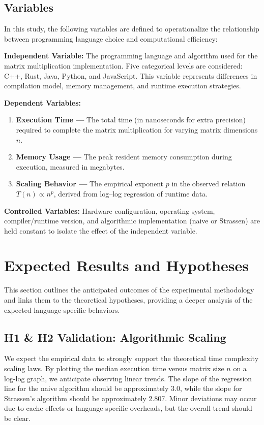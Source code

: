 \documentclass[11pt, a4paper, titlepage]{scrartcl}
\begin{document}
\subsection{Variables}

In this study, the following variables are defined to operationalize the relationship between programming language choice and computational efficiency:

\textbf{Independent Variable:}  
The programming language and algorithm used for the matrix multiplication implementation. Five categorical levels are considered: C++, Rust, Java, Python, and JavaScript. This variable represents differences in compilation model, memory management, and runtime execution strategies.

\textbf{Dependent Variables:}  
\begin{enumerate}
    \item \textbf{Execution Time —} The total time (in nanoseconds for extra precision) required to complete the matrix multiplication for varying matrix dimensions \(n\).  
    \item \textbf{Memory Usage —} The peak resident memory consumption during execution, measured in megabytes.  
    \item \textbf{Scaling Behavior —} The empirical exponent \(p\) in the observed relation \(T(n) \propto n^p\), derived from log–log regression of runtime data.
\end{enumerate}

\textbf{Controlled Variables:}  
Hardware configuration, operating system, compiler/runtime version, and algorithmic implementation (naive or Strassen) are held constant to isolate the effect of the independent variable.

\newpage

\section{Expected Results and Hypotheses}

This section outlines the anticipated outcomes of the experimental methodology and links them to the theoretical hypotheses, providing a deeper analysis of the expected language-specific behaviors.

\subsection{H1 \& H2 Validation: Algorithmic Scaling}
We expect the empirical data to strongly support the theoretical time complexity scaling laws. By plotting the median execution time versus matrix size \(n\) on a log-log graph, we anticipate observing linear trends. The slope of the regression line for the naive algorithm should be approximately 3.0, while the slope for Strassen's algorithm should be approximately 2.807. Minor deviations may occur due to cache effects or language-specific overheads, but the overall trend should be clear.
\end{document}
